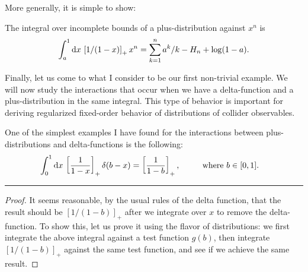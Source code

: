 \begin{subappendices}
More generally, it is simple to show:
~\\
\begin{example}{}
    The integral over incomplete bounds of a plus-distribution against \(x^n\) is
    \begin{align}
        \int_{a}^{1} \dd x\,\left[1/(1-x)\right]_+ x^n
        =
        \sum_{k=1}^n a^k/k - H_n + \log(1-a).
    \end{align}
\end{example}

Finally, let us come to what I consider to be our first non-trivial example.
%
We will now study the interactions that occur when we have a delta-function and a plus-distribution in the same integral.
%
This type of behavior is important for deriving regularized fixed-order behavior of distributions of collider observables.
~\\
\begin{example}{}
    One of the simplest examples I have found for the interactions between plus-distributions and delta-functions is the following:
    \begin{align}
        \int_{0}^{1} \dd x\,\left[\frac{1}{1-x}\right]_+ \delta(b - x)
        &=
        \left[\frac{1}{1-b}\right]_+
        ,
        ~~~~~~~~
        \text{where}~b \in [0,1].
    \end{align}

\vspace{7pt}
\hrule
\vspace{7pt}

\begin{proof}
It seems reasonable, by the usual rules of the delta function, that the result should be \([1/(1-b)]_+\) after we integrate over \(x\) to remove the delta-function.
%
To show this, let us prove it using the flavor of distributions:
%
we first integrate the above integral against a test function \(g(b)\), then integrate \([1/(1-b)]_+\) against the same test function, and see if we achieve the same result.


\end{proof}
\end{example}
\end{subappendices}
